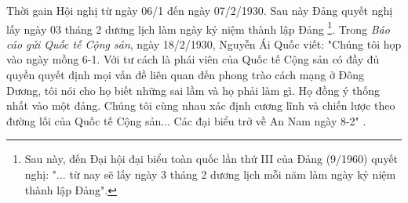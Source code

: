 Thời gain Hội nghị từ ngày 06/1 đến ngày 07/2/1930. Sau này Đảng quyết nghị lấy ngày 03 tháng 2 dương lịch làm ngày kỷ niệm thành lập Đảng \footnote{Sau này, đến Đại hội đại biểu toàn quốc lần thứ III của Đảng (9/1960) quyết nghị: "... từ nay sẽ lấy ngày 3 tháng 2 dương lịch mỗi năm làm ngày kỷ niệm thành lập Đảng".}. Trong \textit{Báo cáo gửi Quốc tế Cộng sản}, ngày 18/2/1930, Nguyễn Ái Quốc viết: "Chúng tôi họp vào ngày mồng 6-1. Với tư cách là phái viên của Quốc tế Cộng sản có đầy đủ quyền quyết định mọi vấn đề liên quan đến phong trào cách mạng ở Đông Dương, tôi nói cho họ biết những sai lầm và họ phải làm gì. Họ đồng ý thống nhất vào một đảng. Chúng tôi cùng nhau xác định cương lĩnh và chiến lược theo đường lối của Quốc tế Cộng sản... Các đại biểu trở về An Nam ngày 8-2" .